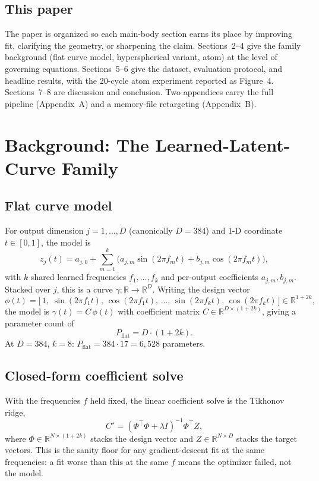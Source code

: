 \documentclass[11pt,a4paper]{article}
\begin{document}
\subsection{This paper}
The paper is organized so each main-body section earns its place by improving fit, clarifying the geometry, or sharpening the claim. Sections~2--4 give the family background (flat curve model, hyperspherical variant, atom) at the level of governing equations. Sections~5--6 give the dataset, evaluation protocol, and headline results, with the 20-cycle atom experiment reported as Figure~4. Sections~7--8 are discussion and conclusion. Two appendices carry the full pipeline (Appendix~A) and a memory-file retargeting (Appendix~B).

\section{Background: The Learned-Latent-Curve Family}
\label{sec:family}

\subsection{Flat curve model}
For output dimension $j = 1, \dots, D$ (canonically $D = 384$) and 1-D coordinate $t \in [0, 1]$, the model is
\begin{equation}
z_j(t) = a_{j,0} + \sum_{m=1}^{k} \big( a_{j,m} \sin(2\pi f_m t) + b_{j,m} \cos(2\pi f_m t) \big),
\label{eq:flat}
\end{equation}
with $k$ shared learned frequencies $f_1, \dots, f_k$ and per-output coefficients $a_{j,m}, b_{j,m}$. Stacked over $j$, this is a curve $\gamma : \mathbb{R} \to \mathbb{R}^D$. Writing the design vector
\begin{equation}
\phi(t) = \big[\, 1,\; \sin(2\pi f_1 t),\, \cos(2\pi f_1 t),\, \dots,\, \sin(2\pi f_k t),\, \cos(2\pi f_k t) \,\big] \in \mathbb{R}^{1+2k},
\label{eq:design}
\end{equation}
the model is $\gamma(t) = C\, \phi(t)$ with coefficient matrix $C \in \mathbb{R}^{D \times (1+2k)}$, giving a parameter count of
\begin{equation}
P_{\mathrm{flat}} = D \cdot (1 + 2k).
\label{eq:paramflat}
\end{equation}
At $D = 384$, $k = 8$: $P_{\mathrm{flat}} = 384 \cdot 17 = 6{,}528$ parameters.

\subsection{Closed-form coefficient solve}
With the frequencies $f$ held fixed, the linear coefficient solve is the Tikhonov ridge,
\begin{equation}
C^{\star} = (\Phi^{\top}\Phi + \lambda I)^{-1} \Phi^{\top} Z,
\label{eq:ridge}
\end{equation}
where $\Phi \in \mathbb{R}^{N \times (1+2k)}$ stacks the design vector and $Z \in \mathbb{R}^{N \times D}$ stacks the target vectors. This is the sanity floor for any gradient-descent fit at the same frequencies: a fit worse than this at the same $f$ means the optimizer failed, not the model.
\end{document}
